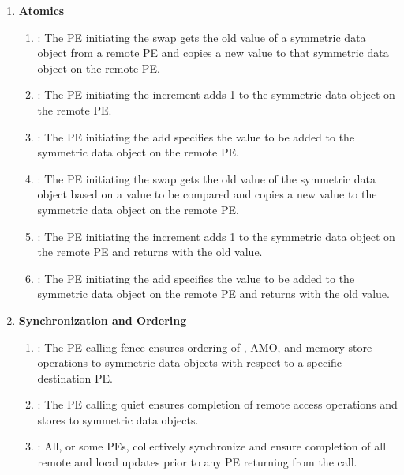 \begin{enumerate}
\item \textbf{Atomics}
\begin{enumerate}
    \item {}: The \ac{PE} initiating the swap gets the old value of a
        symmetric data object from a remote \ac{PE} and copies a new value to
        that symmetric data object on the remote \ac{PE}.
  \item {}: The \ac{PE} initiating the increment adds 1 to the
      symmetric data object on the remote \ac{PE}.
  \item {}: The \ac{PE} initiating the add specifies the value to be added
      to the symmetric data object on the remote \ac{PE}.
  \item {}: The \ac{PE} initiating the swap gets the old value
      of the symmetric data object based on a value to be compared and copies a
      new value to the symmetric data object on the remote \ac{PE}.
  \item {}: The \ac{PE} initiating the increment adds 1 to
      the symmetric data object on the remote \ac{PE} and returns with the old
      value.
  \item {}: The \ac{PE} initiating the add specifies the value to
      be added to the symmetric data object on the remote \ac{PE} and returns with
      the old value.
\end{enumerate}

\item \textbf{Synchronization and Ordering}
\begin{enumerate}
  \item {}: The \ac{PE} calling fence ensures ordering of   
  \PUT, AMO, and memory store operations
  to symmetric data objects with respect to a specific
      destination \ac{PE}. 
  \item {}: The \ac{PE} calling quiet ensures completion of remote access
      operations and stores to symmetric data objects. 
  \item {}: All, or some \acp{PE}, collectively synchronize and ensure
      completion of all remote and local updates prior to any \ac{PE} returning
      from the call.
\end{enumerate}


\end{enumerate}
